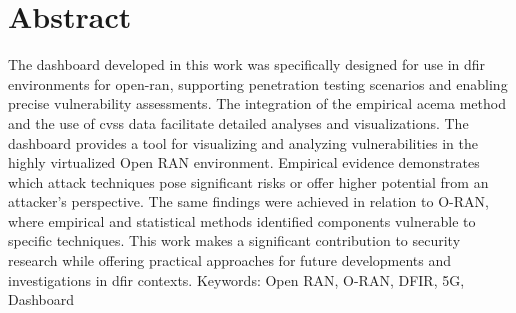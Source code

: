 \chapter*{Abstract}
\label{chap:abstract}
The dashboard developed in this work was specifically designed for use in \gls{dfir} environments for \gls{open-ran}, supporting penetration testing scenarios and enabling precise vulnerability assessments. The integration of the empirical \gls{acema} method and the use of \gls{cvss} data facilitate detailed analyses and visualizations. The dashboard provides a tool for visualizing and analyzing vulnerabilities in the highly virtualized Open RAN environment. Empirical evidence demonstrates which attack techniques pose significant risks or offer higher potential from an attacker{’}s perspective. The same findings were achieved in relation to O-RAN, where empirical and statistical methods identified components vulnerable to specific techniques. This work makes a significant contribution to security research while offering practical approaches for future developments and investigations in \gls{dfir} contexts.
Keywords: Open RAN, O-RAN, DFIR, 5G, Dashboard